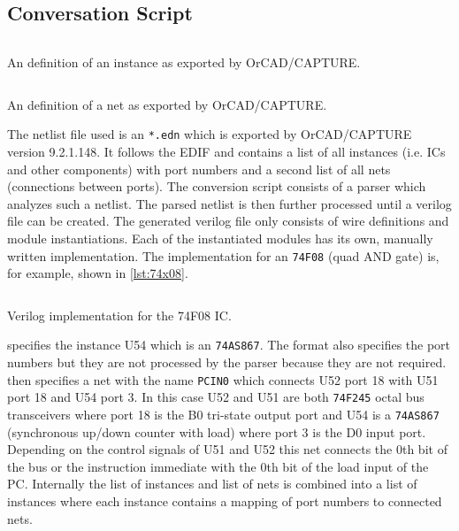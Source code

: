 \subsection{Conversation Script}
\begin{listing}
  \inputminted[linenos,
    breaklines,
    frame=leftline,
    xleftmargin=20pt,
  ]{clojure}{src/edifInstance.edn}
  \caption{An  definition of an instance as exported by OrCAD/CAPTURE.}
  \label{lst:edifInstance}
\end{listing}
\begin{listing}
  \inputminted[linenos,
    breaklines,
    frame=leftline,
    xleftmargin=20pt,
  ]{clojure}{src/edifNet.edn}
  \caption{An  definition of a net as exported by OrCAD/CAPTURE.}
  \label{lst:edifNet}
\end{listing}
The netlist file used is an \texttt{*.edn} which is exported by OrCAD/CAPTURE version 9.2.1.148.
It follows the \gls{EDIF} and contains a list of all instances (i.e. \glspl{IC} and other components) with port numbers and a second list of all nets (connections between ports).
The conversion script consists of a parser which analyzes such a netlist.
The parsed netlist is then further processed until a verilog file can be created.
The generated verilog file only consists of wire definitions and module instantiations.
Each of the instantiated modules has its own, manually written implementation.
The implementation for an \texttt{74F08} (quad AND gate) is, for example, shown in \cref{lst:74x08}.
\begin{listing}[t]
  \inputminted[linenos,
    breaklines,
    frame=leftline,
    xleftmargin=20pt,
  ]{Verilog}{src/ic74x08.v}
  \caption{Verilog implementation for the 74F08 \gls{IC}.}
  \label{lst:74x08}
\end{listing}

 specifies the instance U54 which is an \texttt{74AS867}.
The format also specifies the port numbers but they are not processed by the parser because they are not required.
 then specifies a net with the name \texttt{PCIN0} which connects U52 port 18 with U51 port 18 and U54 port 3.
In this case U52 and U51 are both \texttt{74F245} octal bus transceivers where port 18 is the B0 tri-state output port and U54 is a \texttt{74AS867} (synchronous up/down counter with load) where port 3 is the D0 input port.
Depending on the control signals of U51 and U52 this net connects the 0th bit of the bus or the instruction immediate with the 0th bit of the load input of the \gls{PC}.
Internally the list of instances and list of nets is combined into a list of instances where each instance contains a mapping of port numbers to connected nets.

